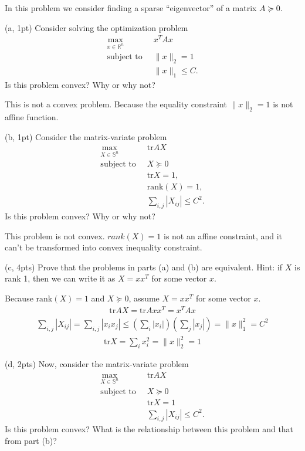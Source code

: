 \documentclass{article}
\theoremstyle{remark}
\theoremstyle{definition}
\newcommand{\st}{\mathop{\mathrm{subject\,\,to}}}
\def\tr{\mathrm{tr}}
\begin{document}
In this problem we consider finding a sparse ``eigenvector'' of a matrix $A
\succeq 0$.

\bigskip
\noindent
(a, 1pt) Consider solving the optimization problem
\[
\begin{split}
\max_{x\in\mathbb{R}^n} \;\; & x^TAx \\
\st \;\; & \|x\|_2 = 1 \\
\;\; & \|x\|_1 \le C.
\end{split}
\]
Is this problem convex? Why or why not?

{
\color{blue}
This is not a convex problem. Because the equality constraint $\|x\|_2=1$ is not affine function.
}

\bigskip
\noindent
(b, 1pt) Consider the matrix-variate problem
\[
\begin{split}
\max_{X \in \mathbb{S}^n} \;\; & \tr AX \\
\st \;\; & X \succeq 0 \\
\;\; & \tr X = 1, \\ 
& \mathrm{rank}(X)=1, \\
& \sum_{i,j} |X_{ij}| \le C^2.
\end{split}
\]
Is this problem convex? Why or why not?

{
\color{blue}
This problem is not convex. $rank(X)=1$ is not an affine constraint, and it can't be transformed into convex inequality constraint.
}

\bigskip
\noindent
(c, 4pts) Prove that the problems in parts (a) and (b) are equivalent.  Hint: if
$X$ is rank 1, then we can write it as $X=xx^T$ for some vector $x$.

{
\color{blue}
Because $\mathrm{rank}(X)=1$ and $X\succeq 0$, assume $X=xx^T$ for some vector $x$.
    \begin{align*}
        \tr AX = \tr Axx^T = x^TA x
    \end{align*}
    \begin{align*}
        \sum_{i,j} |X_{ij}| = \sum_{i,j} |x_i x_j| \le (\sum_i |x_i|)(\sum_j |x_j|) = \|x\|_1^2= C^2
    \end{align*}
    \begin{align*}
        \tr X=\sum_i x_i^2 = \|x\|_2^2 = 1
    \end{align*}

}

\bigskip
\noindent
(d, 2pts) Now, consider the matrix-variate problem
\[
\begin{split}
\max_{X \in \mathbb{S}^n} \;\; & \tr AX \\
\st \;\; & X \succeq 0 \\
\;\; & \tr X = 1 \\
& \sum_{i,j} |X_{ij}| \le C^2.
\end{split}
\]
Is this problem convex?  What is the relationship between this problem and that
from part (b)?  
\end{document}

